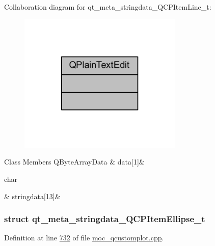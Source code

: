 Collaboration diagram for qt\+\_\+meta\+\_\+stringdata\+\_\+\+Q\+C\+P\+Item\+Line\+\_\+t\+:
\nopagebreak
\begin{figure}[H]
\begin{center}
\leavevmode
\includegraphics[width=222pt]{d3/d4a/a00297}
\end{center}
\end{figure}
\begin{DoxyFields}{Class Members}
\hypertarget{a00067_a02b269c84618a73b8cefdb4c4ae888c6}{Q\+Byte\+Array\+Data}\label{a00067_a02b269c84618a73b8cefdb4c4ae888c6}
&
data\mbox{[}1\mbox{]}&
\\
\hline

\hypertarget{a00067_ac705c65b9062c112f8ff0dd2a2915160}{char}\label{a00067_ac705c65b9062c112f8ff0dd2a2915160}
&
stringdata\mbox{[}13\mbox{]}&
\\
\hline

\end{DoxyFields}
\label{d3/db1/a00200}
\hypertarget{a00067_d3/db1/a00200}{}
\subsubsection{struct qt\+\_\+meta\+\_\+stringdata\+\_\+\+Q\+C\+P\+Item\+Ellipse\+\_\+t}


Definition at line \hyperlink{a00067_source_l00732}{732} of file \hyperlink{a00067_source}{moc\+\_\+qcustomplot.\+cpp}.



